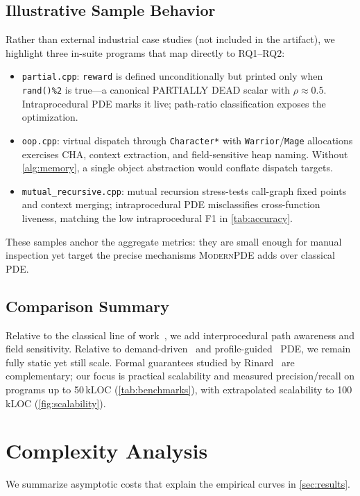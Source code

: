 \documentclass[acmsmall,screen,review,anonymous]{acmart}
\begin{document}
\subsection{Illustrative Sample Behavior}
Rather than external industrial case studies (not included in the artifact), we highlight three in-suite programs that map directly to RQ1--RQ2:
\begin{itemize}[leftmargin=*,itemsep=1pt]
\item \texttt{partial.cpp}: \texttt{reward} is defined unconditionally but printed only when \texttt{rand()\%2} is true---a canonical PARTIALLY DEAD scalar with $\rho\approx 0.5$. Intraprocedural PDE marks it live; path-ratio classification exposes the optimization.
\item \texttt{oop.cpp}: virtual dispatch through \texttt{Character*} with \texttt{Warrior}/\texttt{Mage} allocations exercises CHA, context extraction, and field-sensitive heap naming. Without \autoref{alg:memory}, a single object abstraction would conflate dispatch targets.
\item \texttt{mutual\_recursive.cpp}: mutual recursion stress-tests call-graph fixed points and context merging; intraprocedural PDE misclassifies cross-function liveness, matching the low intraprocedural F1 in \autoref{tab:accuracy}.
\end{itemize}
These samples anchor the aggregate metrics: they are small enough for manual inspection yet target the precise mechanisms \textsc{ModernPDE} adds over classical PDE.

\subsection{Comparison Summary}
Relative to the classical line of work~\cite{knoop1994partial,knoop1992lazy,morel1979global,bodik1998efficient}, we add interprocedural path awareness and field sensitivity. Relative to demand-driven~\cite{takimoto2012demand} and profile-guided~\cite{pathprofile2025} PDE, we remain fully static yet still scale. Formal guarantees studied by Rinard~\cite{rinard2026nexis} are complementary; our focus is practical scalability and measured precision/recall on programs up to 50\,kLOC (\autoref{tab:benchmarks}), with extrapolated scalability to 100\,kLOC (\autoref{fig:scalability}).
\section{Complexity Analysis}
\label{sec:complexity}
We summarize asymptotic costs that explain the empirical curves in \autoref{sec:results}.
\end{document}
